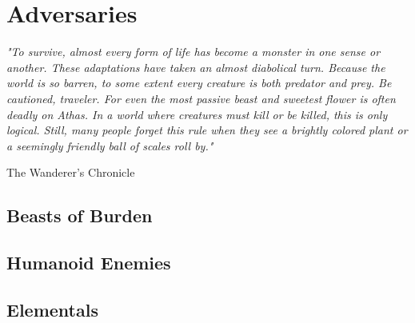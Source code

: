 \chapter{Adversaries}\label{chap:adversaries}

\epigraph{\textit{
    "To survive, almost every form of life has become a monster in one sense or another. These adaptations have taken an
    almost diabolical turn. Because the world is so barren, to some extent every creature is both predator and prey.
    Be cautioned, traveler. For even the most passive beast and sweetest flower is often deadly on Athas. In a world where
    creatures must kill or be killed, this is only logical. Still, many people forget this rule when they see a brightly
    colored plant or a seemingly friendly ball of scales roll by." } } {The Wanderer’s Chronicle}

\begin{multicols*}{2}

\section {Beasts of Burden}




\section {Humanoid Enemies}


\section {Elementals}


\end{multicols*}
